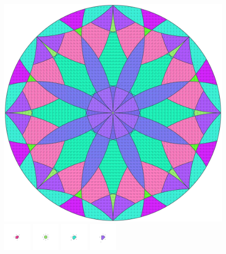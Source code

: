 \documentclass[text.tex]{subfiles}
\begin{document}
\clearpage
\pagestyle{fancy}
\fancyhf{}
\begin{figure}[h!]
\centering
\includegraphics[width=1\textwidth]{img/results/circle8/circle8_241421_(0_1alpha_1).pdf}
\includegraphics[width=0.12\textwidth]{img/results/circle8/circle8_241421_(0_1alpha_1)_001.pdf}
\includegraphics[width=0.12\textwidth]{img/results/circle8/circle8_241421_(0_1alpha_1)_002.pdf}
\includegraphics[width=0.12\textwidth]{img/results/circle8/circle8_241421_(0_1alpha_1)_003.pdf}
\includegraphics[width=0.12\textwidth]{img/results/circle8/circle8_241421_(0_1alpha_1)_004.pdf}

\end{figure}
\end{document}
